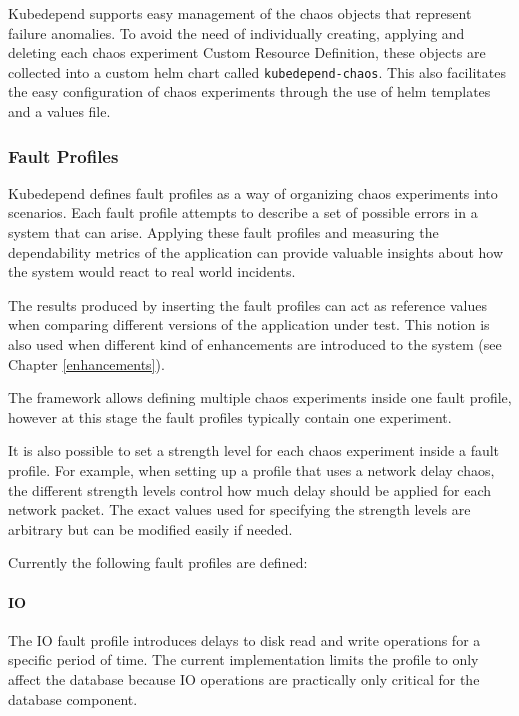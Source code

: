 Kubedepend supports easy management of the chaos objects that represent failure anomalies. To avoid the need of individually creating, applying and deleting each chaos experiment Custom Resource Definition, these objects are collected into a custom helm chart called \texttt{kubedepend-chaos}. This also facilitates the easy configuration of chaos experiments through the use of helm templates and a values file.

\subsubsection{Fault Profiles}


Kubedepend defines fault profiles as a way of organizing chaos experiments into scenarios. Each fault profile attempts to describe a set of possible errors in a system that can arise. Applying these fault profiles and measuring the dependability metrics of the application can provide valuable insights about how the system would react to real world incidents.

The results produced by inserting the fault profiles can act as reference values when comparing different versions of the application under test. This notion is also used when different kind of enhancements are introduced to the system (see Chapter \ref{enhancements}).

The framework allows defining multiple chaos experiments inside one fault profile, however at this stage the fault profiles typically contain one experiment. 

It is also possible to set a strength level for each chaos experiment inside a fault profile. For example, when setting up a profile that uses a network delay chaos, the different strength levels control how much delay should be applied for each network packet. The exact values used for specifying the strength levels are arbitrary but can be modified easily if needed.

Currently the following fault profiles are defined:

\paragraph{IO} The IO fault profile introduces delays to disk read and write operations for a specific period of time. The current implementation limits the profile to only affect the database because IO operations are practically only critical for the database component.

